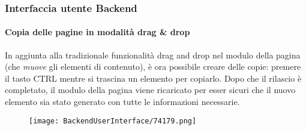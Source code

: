 \begin{frame}[fragile]
	\frametitle{Interfaccia utente Backend}
	\framesubtitle{Copia delle pagine in modalità drag \& drop}

	In aggiunta alla tradizionale funzionalità drag and drop nel modulo della pagina (che \textit{muove} gli elementi di contenuto),
	è ora possibile creare delle copie: premere il tasto CTRL mentre si trascina un elemento per copiarlo.
	Dopo che il rilascio è completato, il modulo della pagina viene ricaricato per esser sicuri che il nuovo elemento
	sia stato generato con tutte le informazioni necessarie.

	\begin{figure}
		\texttt{[image: BackendUserInterface/74179.png]}
	\end{figure}

\end{frame}

